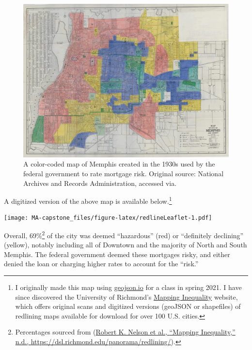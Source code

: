 \documentclass[
  openany]{book}
\begin{document}
\begin{figure}
\centering
\includegraphics{_img/memphis_redliningmap.jpg}
\caption[A color-coded map of Memphis created in the 1930s used by the federal government to rate mortgage risk. Original source: National Archives and Records Administration, accessed via.]{A color-coded map of Memphis created in the 1930s used by the federal government to rate mortgage risk. Original source: National Archives and Records Administration, accessed via.\footnotemark{}}
\end{figure}

A digitized version of the above map is available below.\footnote{I originally made this map using \href{https://geojson.io/}{geojson.io} for a class in spring 2021. I have since discovered the University of Richmond's \href{https://dsl.richmond.edu/panorama/redlining/\#loc=5/39.1/-94.58}{Mapping Inequality} website, which offers original scans and digitized versions (geoJSON or shapefiles) of redlining maps available for download for over 100 U.S. cities.}

\texttt{[image: MA-capstone\_files/figure-latex/redlineLeaflet-1.pdf]}

Overall, 69\%\footnote{Percentages sourced from (\protect\hyperlink{ref-nelson}{Robert K. Nelson et al., {``Mapping Inequality,''} n.d., \url{https://dsl.richmond.edu/panorama/redlining/}}).} of the city was deemed ``hazardous'' (red) or ``definitely declining'' (yellow), notably including all of Downtown and the majority of North and South Memphis. The federal government deemed these mortgages risky, and either denied the loan or charging higher rates to account for the ``risk.''
\end{document}
